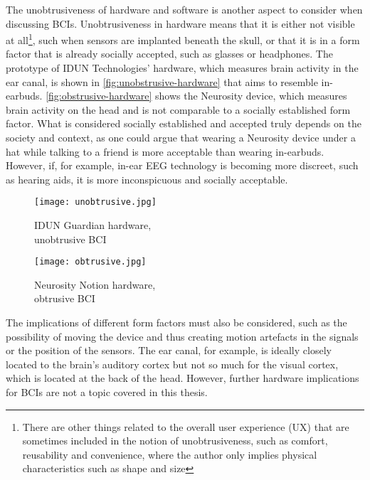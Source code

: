 The unobtrusiveness of hardware and software is another aspect to consider when discussing BCIs. Unobtrusiveness in hardware means that it is either not visible at all\footnote{There are other things related to the overall user experience (UX) that are sometimes included in the notion of unobtrusiveness, such as comfort, reusability and convenience, where the author only implies physical characteristics such as shape and size}, such when sensors are implanted beneath the skull, or that it is in a form factor that is already socially accepted, such as glasses or headphones. The prototype of IDUN Technologies' hardware, which measures brain activity in the ear canal, is shown in \autoref{fig:unobstrusive-hardware} that aims to resemble in-earbuds. \autoref{fig:obstrusive-hardware} shows the Neurosity device, which measures brain activity on the head and is not comparable to a socially established form factor. What is considered socially established and accepted truly depends on the society and context, as one could argue that wearing a Neurosity device under a hat while talking to a friend is more acceptable than wearing in-earbuds. However, if, for example, in-ear EEG technology is becoming more discreet, such as hearing aids, it is more inconspicuous and socially acceptable.

\begin{figure}[!htb]
  \texttt{[image: unobtrusive.jpg]}
  \caption{IDUN Guardian hardware, \\ unobtrusive BCI}
  \label{fig:unobstrusive-hardware}
  \endminipage\hfill
  \texttt{[image: obtrusive.jpg]}
  \caption{Neurosity Notion hardware, \\ obtrusive BCI}
  \label{fig:obstrusive-hardware}
  \endminipage\hfill
\end{figure}

The implications of different form factors must also be considered, such as the possibility of moving the device and thus creating motion artefacts in the signals or the position of the sensors. The ear canal, for example, is ideally closely located to the brain's auditory cortex but not so much for the visual cortex, which is located at the back of the head. However, further hardware implications for BCIs are not a topic covered in this thesis.

